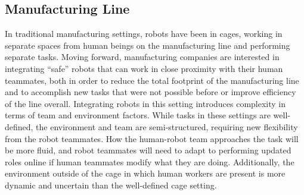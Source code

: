 \documentclass[letterpaper, 10 pt, conference]{ieeeconf}  %
\theoremstyle{definition}
\begin{document}

\subsection{Manufacturing Line}
In traditional manufacturing settings, robots have been in cages, working in separate spaces from human beings on the manufacturing line and performing separate tasks. Moving forward, manufacturing companies are interested in integrating “safe” robots that can work in close proximity with their human teammates, both in order to reduce the total footprint of the manufacturing line and to accomplish new tasks that were not possible before or improve efficiency of the line overall. Integrating robots in this setting introduces complexity in terms of team and environment factors. While tasks in these settings are well-defined, the environment and team are semi-structured, requiring new flexibility from the robot teammates. How the human-robot team approaches the task will be more fluid, and robot teammates will need to adapt to performing updated roles online if human teammates modify what they are doing. Additionally, the environment outside of the cage in which human workers are present is more dynamic and uncertain than the well-defined cage setting.
\end{document}
